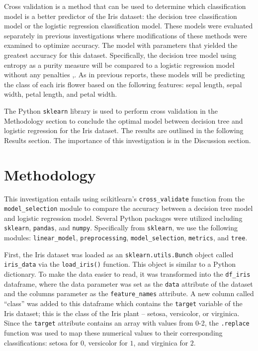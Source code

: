 \documentclass[journal]{IEEEtran}
\begin{document}
Cross validation is a method that can be used to determine which classification model is a better predictor of the Iris dataset: the decision tree classification model or the logistic regression classification model. These models were evaluated separately in previous investigations where modifications of these methods were examined to optimize accuracy. The model with parameters that yielded the greatest accuracy for this dataset. Specifically, the decision tree model using entropy as a purity measure will be compared to a logistic regression model without any penalties \cite{b2},\cite{b3}. As in previous reports, these models will be predicting the class of each iris flower based on the following features: sepal length, sepal width, petal length, and petal width.

The Python \lstinline{sklearn} library is used to perform cross validation in the Methodology section to conclude the optimal model between decision tree and logistic regression for the Iris dataset. The results are outlined in the following Results section. The importance of this investigation is in the Discussion section. 


\section{Methodology}
\label{sec:methodology}

This investigation entails using scikitlearn’s \lstinline{cross_validate} function from the \lstinline{model_selection} module to compare the accuracy between a decision tree model and logistic regression model. Several Python packages were utilized including \lstinline{sklearn}, \lstinline{pandas}, and \lstinline{numpy}. Specifically from \lstinline{sklearn}, we use the following modules: \lstinline{linear_model}, \lstinline{preprocessing}, \lstinline{model_selection}, \lstinline{metrics}, and \lstinline{tree}. 

First, the Iris dataset was loaded as an \lstinline{sklearn.utils.Bunch} object called \lstinline{iris_data} via the \lstinline{load_iris()} function. This object is similar to a Python dictionary. To make the data easier to read, it was transformed into the \lstinline{df_iris} dataframe, where the data parameter was set as the \lstinline{data} attribute of the dataset and the columns parameter as the \lstinline{feature_names} attribute. A new column called “class” was added to this dataframe which contains the \lstinline{target} variable of the Iris dataset; this is the class of the Iris plant – setosa, versicolor, or virginica. Since the \lstinline{target} attribute contains an array with values from 0-2, the \lstinline{.replace} function was used to map these numerical values to their corresponding classifications: setosa for \(0\), versicolor for \(1\), and virginica for \(2\). 
\end{document}
